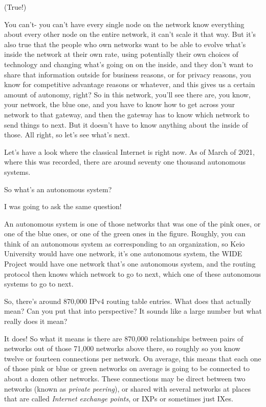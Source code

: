 \mmm (True!)

\rrr You can't- you can't have every single node on the network know everything about every other node on the entire network, it can't scale it that way. But it's also true that the people who own networks want to be able to evolve what's inside the network at their own rate, using potentially their own choices of technology and changing what's going on on the inside, and they don't want to share that information outside for business reasons, or for privacy reasons, you know for competitive advantage reasons or whatever, and this gives us a certain amount of autonomy, right? So in this network, you'll see there are, you know, your network, the blue one, and you have to know how to get across your network to that gateway, and then the gateway has to know which network to send things to next. But it doesn't have to know anything about the inside of those. All right, so let's see what's next.

\mmm Let's have a look where the classical Internet is right now. As of March of 2021, where this was recorded, there are around seventy one thousand autonomous systems.

\rrr So what's an autonomous system?

\mmm I was going to ask the same question!

\rrr An autonomous system is one of those networks that was one of the pink ones, or one of the blue ones, or one of the green ones in the figure. Roughly, you can think of an autonomous system as corresponding to an organization, so Keio University would have one network, it's one autonomous system, the WIDE Project would have one network that's one autonomous system, and the routing protocol then knows which network to go to next, which one of these autonomous systems to go to next.

\mmm So, there's around 870,000 IPv4 routing table entries. What does that actually mean? Can you put that into perspective? It sounds like a large number but what really does it mean?

\rrr It does! So what it means is there are 870,000 relationships between pairs of networks out of those 71,000 networks above there, so roughly so you know twelve or fourteen connections per network. On average, this means that each one of those pink or blue or green networks on average is going to be connected to about a dozen other networks. These connections may be direct between two networks (known as \emph{private peering}), or shared with several networks at places that are called \emph{Internet exchange points}, or IXPs or sometimes just IXes.

